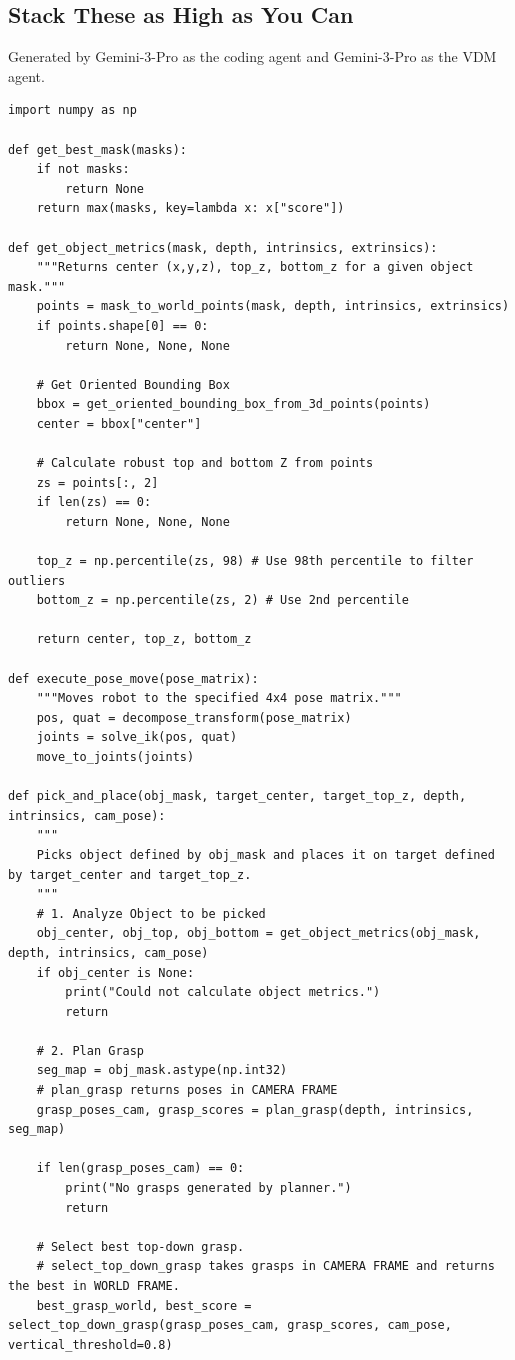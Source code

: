 \subsection{Stack These as High as You Can}
\label{app:code_stack_as_high_as_you_can}
Generated by Gemini-3-Pro as the coding agent and Gemini-3-Pro as the VDM agent.
\begin{lstlisting}
import numpy as np

def get_best_mask(masks):
    if not masks:
        return None
    return max(masks, key=lambda x: x["score"])

def get_object_metrics(mask, depth, intrinsics, extrinsics):
    """Returns center (x,y,z), top_z, bottom_z for a given object mask."""
    points = mask_to_world_points(mask, depth, intrinsics, extrinsics)
    if points.shape[0] == 0:
        return None, None, None
    
    # Get Oriented Bounding Box
    bbox = get_oriented_bounding_box_from_3d_points(points)
    center = bbox["center"]
    
    # Calculate robust top and bottom Z from points
    zs = points[:, 2]
    if len(zs) == 0:
        return None, None, None
        
    top_z = np.percentile(zs, 98) # Use 98th percentile to filter outliers
    bottom_z = np.percentile(zs, 2) # Use 2nd percentile
    
    return center, top_z, bottom_z

def execute_pose_move(pose_matrix):
    """Moves robot to the specified 4x4 pose matrix."""
    pos, quat = decompose_transform(pose_matrix)
    joints = solve_ik(pos, quat)
    move_to_joints(joints)

def pick_and_place(obj_mask, target_center, target_top_z, depth, intrinsics, cam_pose):
    """
    Picks object defined by obj_mask and places it on target defined by target_center and target_top_z.
    """
    # 1. Analyze Object to be picked
    obj_center, obj_top, obj_bottom = get_object_metrics(obj_mask, depth, intrinsics, cam_pose)
    if obj_center is None:
        print("Could not calculate object metrics.")
        return

    # 2. Plan Grasp
    seg_map = obj_mask.astype(np.int32)
    # plan_grasp returns poses in CAMERA FRAME
    grasp_poses_cam, grasp_scores = plan_grasp(depth, intrinsics, seg_map)
    
    if len(grasp_poses_cam) == 0:
        print("No grasps generated by planner.")
        return

    # Select best top-down grasp. 
    # select_top_down_grasp takes grasps in CAMERA FRAME and returns the best in WORLD FRAME.
    best_grasp_world, best_score = select_top_down_grasp(grasp_poses_cam, grasp_scores, cam_pose, vertical_threshold=0.8)
    

\end{lstlisting}
